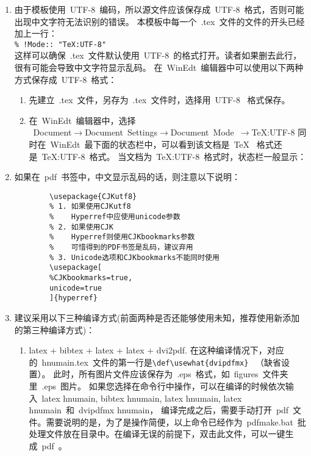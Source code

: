 \begin{enumerate}
  \item 由于模板使用~UTF-8~编码，所以源文件应该保存成~UTF-8~格式，否则可能出现中文字符无法识别的错误。
  本模板中每一个~.tex~文件的文件的开头已经加上一行：\\
  \verb|% !Mode:: "TeX:UTF-8"|\\
     这样可以确保~.tex~文件默认使用~UTF-8~的格式打开。读者如果删去此行，很有可能会导致中文字符显示乱码。
     在~WinEdt~编辑器中可以使用以下两种方式保存成~UTF-8~格式：
      \begin{enumerate}
        \item 先建立~.tex~文件，另存为~.tex~文件时，选择用~UTF-8~ 格式保存。
        \item
            在~WinEdt~编辑器中，选择\\
            \mbox{~Document$\rightarrow$Document Settings$\rightarrow$Document Mode $\rightarrow$TeX:UTF-8} 同时在~WinEdt~最下面的状态栏中，可以看到该文档是~TeX~ 格式还是~TeX:UTF-8~格式。
            当文档为~TeX:UTF-8~格式时，状态栏一般显示：
      \end{enumerate}
  \item 如果在~pdf~书签中，中文显示乱码的话，则注意以下说明：
    \begin{verbatim}
        \usepackage{CJKutf8}
        % 1. 如果使用CJKutf8
        %    Hyperref中应使用unicode参数
        % 2. 如果使用CJK
        %    Hyperref则使用CJKbookmarks参数
        %    可惜得到的PDF书签是乱码，建议弃用
        % 3. Unicode选项和CJKbookmarks不能同时使用
        \usepackage[
        %CJKbookmarks=true,
        unicode=true
        ]{hyperref}
     \end{verbatim}
  \item 建议采用以下三种编译方式(前面两种是否还能够使用未知，推荐使用新添加的第三种编译方式)：
  \begin{enumerate}
    \item latex + bibtex + latex + latex + dvi2pdf. 在这种编译情况下，对应的~hnumain.tex~文件的第一行是\verb|\def\usewhat{dvipdfmx}|~ （缺省设置）。 此时，所有图片文件应该保存为~.eps~格式，如~figures~文件夹里~.eps~图片。
          如果您选择在命令行中操作，可以在编译的时候依次输入~latex hnumain, bibtex hnumain, latex hnumain, latex hnumain~和~dvipdfmx hnumain， 编译完成之后，需要手动打开~pdf~文件。需要说明的是，为了是操作简便，以上命令已经作为~pdfmake.bat~批处理文件放在目录中。在编译无误的前提下，双击此文件，可以一键生成~pdf~。


\end{enumerate}
\end{enumerate}
